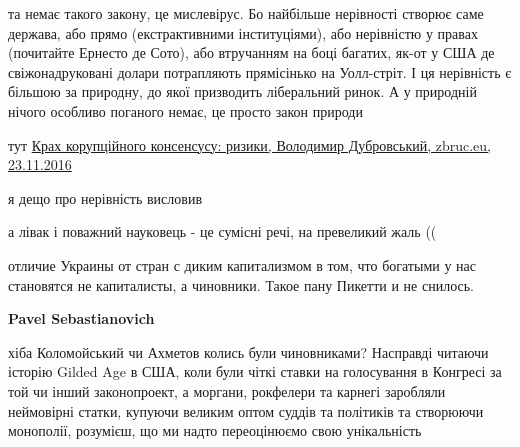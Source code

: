 \begin{itemize}
\begin{itemize}
та немає такого закону, це мислевірус. Бо найбільше нерівності створює саме
держава, або прямо (екстрактивними інституціями), або нерівністю у правах
(почитайте Ернесто де Сото), або втручанням на боці багатих, як-от у США де
свіжонадруковані долари потрапляють прямісінько на Уолл-стріт. І ця нерівність
є більшою за природну, до якої призводить ліберальний ринок. А у природній
нічого особливо поганого немає, це просто закон природи

 
тут 
\href{https://zbruc.eu/node/59044}{%
Крах корупційного консенсусу: ризики, Володимир Дубровський, zbruc.eu, 23.11.2016%
}

я дещо про нерівність висловив

 
а лівак і поважний науковець - це сумісні речі, на превеликий жаль ((

 

отличие Украины от стран с диким капитализмом в том, что богатыми у нас
становятся не капиталисты, а чиновники. Такое пану Пикетти и не снилось.


 
\textbf{Pavel Sebastianovich} 

хіба Коломойський чи Ахметов колись були чиновниками? Насправді читаючи історію
Gilded Age в США, коли були чіткі ставки на голосування в Конгресі за той чи
інший законопроект, а моргани, рокфелери та карнегі заробляли неймовірні
статки, купуючи великим оптом суддів та політиків та створюючи монополії,
розумієш, що ми надто переоцінюємо свою унікальність \Smiley[1.0][yellow]



\end{itemize}
\end{itemize}
